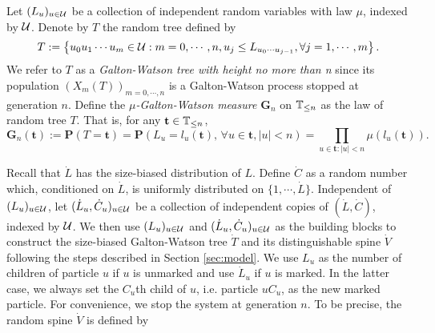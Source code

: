 \documentclass[12pt]{amsart}
\theoremstyle{remark}
\numberwithin{equation}{section}
\newcommand{\defn}[1]{{\em #1}}
\newcommand{\prob}{\mathbf P}
\newcommand{\set}[1]{\left\{ #1 \right\}}
\newcommand{\tree}{\mathbf t}
\newcommand{\bG}{\mathbf G}\newcommand{\bbG}{\mathbb G}\newcommand{\cG}{\mathcal G}
\begin{document}
\par
Let $(L_u)_{u\in\mathcal U}$ be a collection of independent random variables 
with law $\mu$, indexed by $\mathcal U$. Denote by $T$ the 
random tree defined by
\begin{equation*}
		T
	:=
   \set{u_0u_1\cdots u_m\in \cU: m=0,\cdots,n, u_j\leq L_{u_0\cdots u_{j-1}},\forall j=1,\cdots,m}.
\end{equation*}
We refer to $T$ as a \defn{Galton-Watson tree with height no more than n} 
since its population $(X_m(T))_{m=0,\cdots,n}$ is a Galton-Watson 
process stopped at generation $n$. 
Define the \defn{$\mu$-Galton-Watson measure $\bG_n$} on $\mathbb T_{\leq n}$ 
as the law of random tree $T$.
That is, for any $\tree\in\bbT_{\leq n}$,
\begin{equation*}
		\bG_n(\tree)
    :=
		\prob(T=\tree)
	=
        \prob(L_u=l_u(\tree),\,\forall u\in\tree,|u|<n)
	=
	\prod_{u\in \tree:|u|<n}\mu(l_u(\tree)).
\end{equation*}
\par
Recall that $\dot L$ has the size-biased distribution of $L$. 
Define $\dot C$ as a random number which, 
conditioned on $\dot L$,
is uniformly distributed on $\{1,\cdots,\dot L\}$. 
Independent of $(L_u)_{u\in\mathcal U}$, 
let $(\dot L_u,\dot C_u)_{u\in \mathcal U}$ be a collection of 
independent copies of $(\dot L,\dot C)$, indexed by $\mathcal U$.  
We then use $(L_u)_{u\in\mathcal U}$ and $(\dot L_u,\dot C_u)_{u\in\mathcal U}$ 
as the building blocks to construct the size-biased Galton-Watson tree 
$\dot T$ and its distinguishable spine $\dot V$ following the steps described 
in Section \ref{sec:model}. 
We use $L_u$ as the number of children of particle $u$ if $u$ is unmarked 
and use $\dot L_u$ if $u$ is marked. In the latter case, we always set 
the $C_u$th child of $u$, i.e. particle $uC_u$, 
as the new marked particle. 
For convenience, 
we stop the system at generation $n$. To be precise, the random spine $\dot V$ is defined by
\end{document}
